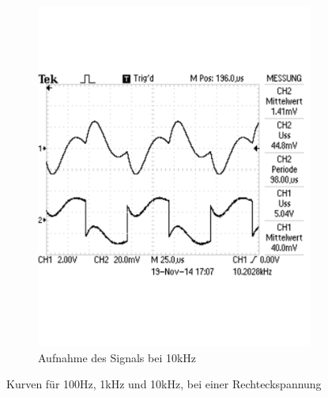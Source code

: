 \documentclass[12pt,a4paper]{article}
\begin{document}
\begin{figure}[H]
\begin{subfigure}[b]{0.28\textwidth}
                \includegraphics[width=\textwidth , scale = 0.4]{2_5_recht_10k.pdf}
                \caption[Aufnahme des Signals bei 10kHz]{Aufnahme des Signals bei 10kHz}
  				\label{fig:2_5_recht_10k}
        \end{subfigure}
        \caption{Kurven für 100Hz, 1kHz und 10kHz, bei einer Rechteckspannung}
        \label{fig:2_5_recht}
\end{figure}
\end{document}
